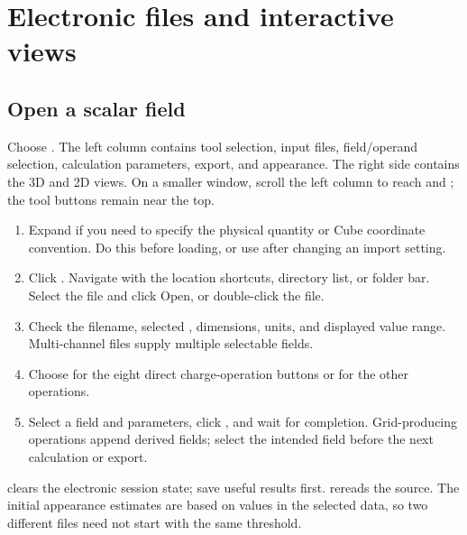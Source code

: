 \chapter{Electronic files and interactive views}\label{ch:electronic}
\section{Open a scalar field}
Choose . The left column contains tool selection, input files, field/operand selection, calculation parameters, export, and appearance. The right side contains the 3D and 2D views. On a smaller window, scroll the left column to reach  and ; the tool buttons remain near the top.

\begin{enumerate}
\item Expand  if you need to specify the physical quantity or Cube coordinate convention. Do this before loading, or use  after changing an import setting.
\item Click . Navigate with the location shortcuts, directory list, or folder bar. Select the file and click Open, or double-click the file.
\item Check the filename, selected , dimensions, units, and displayed value range. Multi-channel files supply multiple selectable fields.
\item Choose  for the eight direct charge-operation buttons or  for the other operations.
\item Select a field and parameters, click , and wait for completion. Grid-producing operations append derived fields; select the intended field before the next calculation or export.
\end{enumerate}
 clears the electronic session state; save useful results first.  rereads the source. The initial appearance estimates are based on values in the selected data, so two different files need not start with the same threshold.


